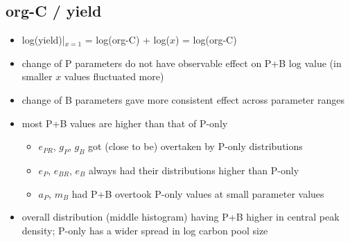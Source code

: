 \documentclass[a4paper]{article}
\begin{document}
\subsection{org-C / yield}
\begin{itemize}
    \item log(yield)|$_{x=1}$ = log(org-C) + log($x$) = log(org-C)
    \item change of P parameters do not have observable effect on P+B log value (in smaller $x$ values fluctuated more)
    \item change of B parameters gave more consistent effect across parameter ranges
    \item most P+B values are higher than that of P-only
    \begin{itemize}
        \item $e_{PR}$, $g_P$, $g_B$ got (close to be) overtaken by P-only distributions
        \item $e_P$, $e_{BR}$, $e_B$ always had their distributions higher than P-only
        \item $a_P$, $m_B$ had P+B overtook P-only values at small parameter values
    \end{itemize}
    \item overall distribution (middle histogram) having P+B higher in central peak density; P-only has a wider spread in log carbon pool size
\end{itemize}
\end{document}
